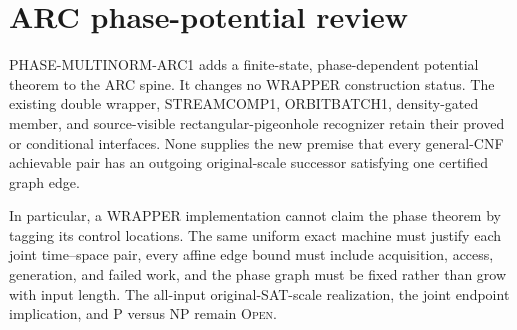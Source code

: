 \section{ARC phase-potential review}
PHASE-MULTINORM-ARC1 adds a finite-state, phase-dependent potential theorem to
the ARC spine.  It changes no WRAPPER construction status.  The existing
double wrapper, STREAMCOMP1, ORBITBATCH1, density-gated member, and
source-visible rectangular-pigeonhole recognizer retain their proved or
conditional interfaces.  None supplies the new premise that every
general-CNF achievable pair has an outgoing original-scale successor
satisfying one certified graph edge.

In particular, a WRAPPER implementation cannot claim the phase theorem by
tagging its control locations.  The same uniform exact machine must justify
each joint time--space pair, every affine edge bound must include acquisition,
access, generation, and failed work, and the phase graph must be fixed rather
than grow with input length.  The all-input original-SAT-scale realization,
the joint endpoint implication, and P versus NP remain \textsc{Open}.
